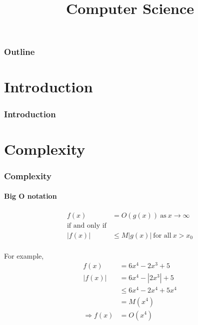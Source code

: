 
\title{Computer Science}
\begin{frame}\logoTree
	\institute{}
	\titlepage
\end{frame}

\begin{frame}\frametitle{Outline}\logoTree
	\tableofcontents
\end{frame}

\section{Introduction}
\begin{frame}\frametitle{Introduction}\logoEvolution\mypagenum

\end{frame}


\section{Complexity}

\begin{frame}
\frametitle{Complexity}
\framesubtitle{Big O notation}
\logoEvolution\mypagenum	
	\begin{block}{}
		\begin{align*}
			 f(x) &= O(g(x)) \ \text{as} \ x \rightarrow \infty \\
			\text{if and only if} \\
			|f(x)| &\leq  M|g(x) | \ \text{for all} \ x >x_0 \\
		\end{align*}
	\end{block}
	For example,
	\begin{align*}
		f(x) 				&= 6x^4-2x^3+5		\\
		|f(x)| 			&= 6x^4-|2x^3|+5	\\
						& \leq 6x^4-2x^4+5x^4\\
						&= M(x^4)			\\
		\Rightarrow f(x)	&=O(x^4)
	\end{align*}
\end{frame}


